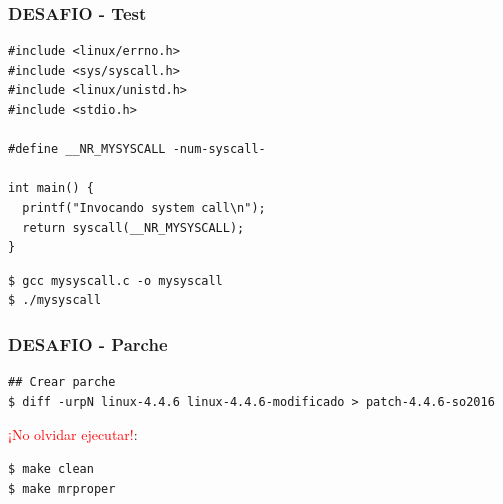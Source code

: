 \begin{frame}[fragile]
\frametitle{DESAFIO - Test}
  \begin{lstlisting}
#include <linux/errno.h>
#include <sys/syscall.h>
#include <linux/unistd.h>
#include <stdio.h>

#define __NR_MYSYSCALL -num-syscall-

int main() {
  printf("Invocando system call\n");
  return syscall(__NR_MYSYSCALL);
}
  \end{lstlisting}
  \begin{lstlisting}
$ gcc mysyscall.c -o mysyscall
$ ./mysyscall
  \end{lstlisting}
\end{frame}


\begin{frame}[fragile]
\frametitle{DESAFIO - Parche}
  \begin{lstlisting}
## Crear parche
$ diff -urpN linux-4.4.6 linux-4.4.6-modificado > patch-4.4.6-so2016
  \end{lstlisting}
  \textcolor{red}{¡No olvidar ejecutar!}:
  \begin{lstlisting}
$ make clean
$ make mrproper
  \end{lstlisting}  
\end{frame}

